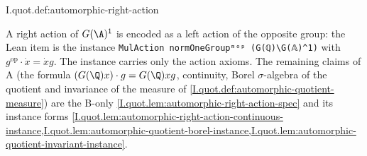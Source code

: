 \begin{definition}
\end{definition}
\begin{tfformal}{I.quot.def:automorphic-right-action}
\begin{tffidelity}
A right action of $G(\A)^1$ is encoded as a left action of the opposite group: the Lean item is the instance \texttt{MulAction normOneGroupᵐᵒᵖ (G(ℚ)\textbackslash G(𝔸)\^{}1)} with $g^{\mathrm{op}}\cdot\dot x=\dot xg$. The instance carries only the action axioms. The remaining claims of A (the formula $(G(\Q)x)\cdot g=G(\Q)xg$, continuity, Borel $\sigma$-algebra of the quotient and invariance of the measure of \cref{I.quot.def:automorphic-quotient-measure}) are the B-only \cref{I.quot.lem:automorphic-right-action-spec} and its instance forms \cref{I.quot.lem:automorphic-right-action-continuous-instance,I.quot.lem:automorphic-quotient-borel-instance,I.quot.lem:automorphic-quotient-invariant-instance}.
\end{tffidelity}
\end{tfformal}

